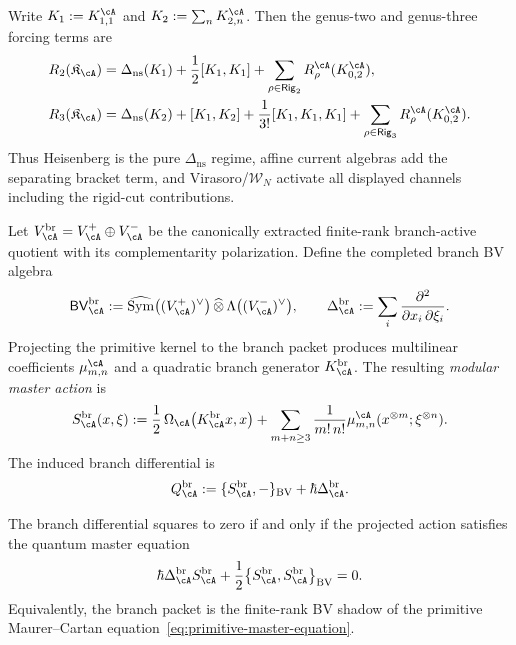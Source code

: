 \begin{proposition}
\label{prop:primitive-shell-equations}
Write $K_1:=K^{\cA}_{1,1}$ and $K_2:=\sum_n K^{\cA}_{2,n}$.
Then the genus-two and genus-three forcing terms are
\begin{align}
\label{eq:primitive-shell-g2}
R_2(\mathfrak K_\cA)
&=
\Delta_{\mathrm{ns}}(K_1)
+\frac12[K_1,K_1]
+\sum_{\rho\in\mathsf{Rig}_2}R^{\cA}_{\rho}(K^{\cA}_{0,2}),
\\
\label{eq:primitive-shell-g3}
R_3(\mathfrak K_\cA)
&=
\Delta_{\mathrm{ns}}(K_2)
+[K_1,K_2]
+\frac1{3!}[K_1,K_1,K_1]
+\sum_{\rho\in\mathsf{Rig}_3}R^{\cA}_{\rho}(K^{\cA}_{0,2}).
\end{align}
Thus Heisenberg is the pure $\Delta_{\mathrm{ns}}$ regime, affine current
algebras add the separating bracket term, and Virasoro/$\mathcal W_N$ activate
all displayed channels including the rigid-cut contributions.
\end{proposition}

\begin{definition}
\label{def:reduced-branch-master-action}
Let $V^{\mathrm{br}}_\cA=V^+_\cA\oplus V^-_\cA$ be the canonically extracted
finite-rank branch-active quotient with its complementarity polarization.
Define the completed branch BV algebra
\[
\mathsf{BV}^{\mathrm{br}}_\cA
:=
\widehat{\operatorname{Sym}}\bigl((V^+_\cA)^\vee\bigr)
\,\widehat\otimes\,
\Lambda\bigl((V^-_\cA)^\vee\bigr),
\qquad
\Delta^{\mathrm{br}}_\cA
:=
\sum_i \frac{\partial^2}{\partial x_i\,\partial \xi_i}.
\]
Projecting the primitive kernel to the branch packet produces multilinear
coefficients $\mu^{\cA}_{m,n}$ and a quadratic branch generator
$K^{\mathrm{br}}_\cA$.  The resulting \emph{modular master action} is
\begin{equation}
\label{eq:branch-master-action}
S^{\mathrm{br}}_\cA(x,\xi)
:=
\frac12\,\Omega_\cA\bigl(K^{\mathrm{br}}_\cA x,x\bigr)
+
\sum_{m+n\ge 3}
\frac{1}{m!\,n!}
\mu^{\cA}_{m,n}(x^{\otimes m};\xi^{\otimes n}).
\end{equation}
The induced branch differential is
\[
Q^{\mathrm{br}}_\cA
:=
\{S^{\mathrm{br}}_\cA,-\}_{\mathrm{BV}}
+\hbar\Delta^{\mathrm{br}}_\cA.
\]
\end{definition}

\begin{proposition}
\label{prop:branch-master-equation}
The branch differential squares to zero if and only if the projected action
satisfies the quantum master equation
\begin{equation}
\label{eq:branch-qme}
\hbar\Delta^{\mathrm{br}}_\cA S^{\mathrm{br}}_\cA
+\frac12\bigl\{S^{\mathrm{br}}_\cA,S^{\mathrm{br}}_\cA\bigr\}_{\mathrm{BV}}
=0.
\end{equation}
Equivalently, the branch packet is the finite-rank BV shadow of the primitive
Maurer--Cartan equation~\eqref{eq:primitive-master-equation}.
\end{proposition}

